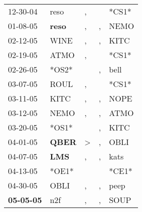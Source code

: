 \begin{supertabular}{p{0.07\textwidth}p{0.06\textwidth}p{0.02\textwidth}p{0.02\textwidth}p{0.06\textwidth}}
          12-30-04\textsuperscript{} &           reso\textsuperscript{} &                , &                  &                            *CS1* \\
          01-08-05\textsuperscript{} &  \textbf{reso\textsuperscript{}} &                , &                , &           NEMO\textsuperscript{} \\
          02-12-05\textsuperscript{} &           WINE\textsuperscript{} &                , &                , &           KITC\textsuperscript{} \\
          02-19-05\textsuperscript{} &           ATMO\textsuperscript{} &                , &                  &                            *CS1* \\
          02-26-05\textsuperscript{} &                            *OS2* &                  &                , &           bell\textsuperscript{} \\
          03-07-05\textsuperscript{} &           ROUL\textsuperscript{} &                , &                  &                            *CS1* \\
          03-11-05\textsuperscript{} &           KITC\textsuperscript{} &                , &                , &           NOPE\textsuperscript{} \\
          03-12-05\textsuperscript{} &           NEMO\textsuperscript{} &                , &                , &           ATMO\textsuperscript{} \\
          03-20-05\textsuperscript{} &                            *OS1* &                  &                , &           KITC\textsuperscript{} \\
          04-01-05\textsuperscript{} &  \textbf{QBER\textsuperscript{}} &     \textgreater &                , &           OBLI\textsuperscript{} \\
          04-07-05\textsuperscript{} &   \textbf{LMS\textsuperscript{}} &                , &                , &           kats\textsuperscript{} \\
          04-13-05\textsuperscript{} &                            *OE1* &                  &                  &                            *CE1* \\
          04-30-05\textsuperscript{} &           OBLI\textsuperscript{} &                , &                , &           peep\textsuperscript{} \\
 \textbf{05-05-05\textsuperscript{}} &            n2f\textsuperscript{} &                , &                , &           SOUP\textsuperscript{} \\

\end{supertabular}
